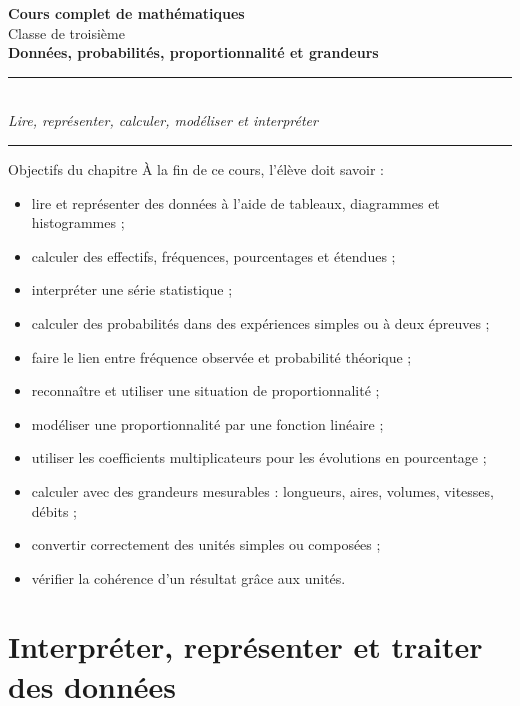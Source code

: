 \documentclass[11pt,a4paper]{article}
\begin{document}
\begin{center}
    {\Huge \textbf{Cours complet de mathématiques}}\\[0.3cm]
    {\Large Classe de troisième}\\[0.3cm]
    {\Large \textbf{Données, probabilités, proportionnalité et grandeurs}}\\[0.5cm]
    \rule{0.9\linewidth}{0.5pt}\\[0.3cm]
    \textit{Lire, représenter, calculer, modéliser et interpréter}\\[0.3cm]
    \rule{0.9\linewidth}{0.5pt}
\end{center}

\vspace{0.5cm}

\begin{retenirbox}{Objectifs du chapitre}
À la fin de ce cours, l'élève doit savoir :
\begin{itemize}
    \item lire et représenter des données à l'aide de tableaux, diagrammes et histogrammes ;
    \item calculer des effectifs, fréquences, pourcentages et étendues ;
    \item interpréter une série statistique ;
    \item calculer des probabilités dans des expériences simples ou à deux épreuves ;
    \item faire le lien entre fréquence observée et probabilité théorique ;
    \item reconnaître et utiliser une situation de proportionnalité ;
    \item modéliser une proportionnalité par une fonction linéaire ;
    \item utiliser les coefficients multiplicateurs pour les évolutions en pourcentage ;
    \item calculer avec des grandeurs mesurables : longueurs, aires, volumes, vitesses, débits ;
    \item convertir correctement des unités simples ou composées ;
    \item vérifier la cohérence d'un résultat grâce aux unités.
\end{itemize}
\end{retenirbox}

\tableofcontents
\newpage

\section{Interpréter, représenter et traiter des données}
\end{document}
